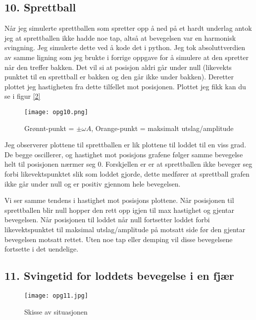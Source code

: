 \documentclass[a4paper,12pt,norsk]{article}
\begin{document}
\subsection{10. Sprettball}
Når jeg simulerte sprettballen som spretter opp å ned på et hardt underlag antok jeg at sprettballen ikke hadde noe tap, altså at bevegelsen var en harmonisk svingning. Jeg simulerte dette ved å kode det i python. Jeg tok absoluttverdien av samme ligning som jeg brukte i forrige oppgave for å simulere at den spretter når den treffer bakken. Det vil si at posisjon aldri går under null (likevekts punktet til en sprettball er bakken og den går ikke under bakken). Deretter plottet jeg hastigheten fra dette tilfellet mot posisjonen. Plottet jeg fikk kan du se i figur \vref{2}

\begin{figure}[h!]
\texttt{[image: opg10.png]}
\caption[Sprettball]{Grønnt-punkt = $\pm \omega A$, Orange-punkt = maksimalt utslag/amplitude}
\label{2}
\end{figure}

Jeg observerer plottene til sprettballen er lik plottene til loddet til en viss grad. De begge oscillerer, og hastighet mot posisjons grafene følger samme bevegelse helt til posisjonen nærmer seg 0. Forskjellen er er at sprettballen ikke beveger seg forbi likevektspunktet slik som loddet gjorde, dette medfører at sprettball grafen ikke går under null og er positiv gjennom hele bevegelsen. 

Vi ser samme tendens i hastighet mot posisjons plottene. Når posisjonen til sprettballen blir null hopper den rett opp igjen til max hastighet og gjentar bevegelsen. Når posisjonen til loddet når null fortsetter loddet forbi likevektspunktet til maksimal utslag/amplitude på motsatt side før den gjentar bevegelsen motsatt rettet. Uten noe tap eller demping vil disse bevegelsene fortsette i det uendelige. 

\newpage
\subsection{11. Svingetid for loddets bevegelse i en fjær}

\begin{figure}[h!]
\texttt{[image: opg11.jpg]}
\caption{Skisse av situasjonen}
\label{3}
\end{figure}
\end{document}
